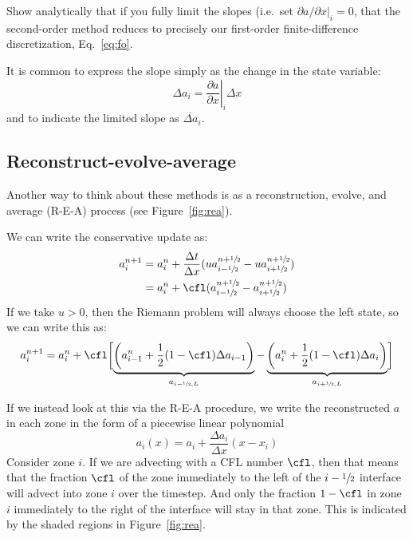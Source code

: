\begin{exercise}
{Show analytically that if you fully limit the slopes
  (i.e.\ set $\partial a/\partial x |_i = 0$, that the second-order
  method reduces to precisely our first-order finite-difference discretization,
  Eq.~\ref{eq:fo}.  }
\end{exercise}

It is common to express the slope simply as the change in the state variable:
\begin{equation}
\Delta a_i = \left . \frac{\partial a}{\partial x} \right |_i \Delta x
\end{equation}
and to indicate the limited slope as $\overline{\Delta a}_i$.



\subsection{Reconstruct-evolve-average}

Another way to think about these methods is as a reconstruction,
evolve, and average (R-E-A) process (see Figure~\ref{fig:rea}).

We can write the conservative update as:
\begin{align}
a_i^{n+1} &= a_i^n + \frac{\Delta t}{\Delta x}
    (u a^{n+\myhalf}_{i-\myhalf} - u a^{n+\myhalf}_{i+\myhalf} ) \\
          &= a_i^n + \cfl (a^{n+\myhalf}_{i-\myhalf} - a^{n+\myhalf}_{i+\myhalf} )
\end{align}
If we take $u > 0$, then the Riemann problem will always choose the
left state, so we can write this as:
\begin{equation}
a_i^{n+1} = a_i^n +
     \cfl \biggl [\underbrace{\left (a_{i-1}^n + \frac{1}{2} (1-\cfl) \Delta a_{i-1} \right )}_{a_{i-\myhalf,L}} -
              \underbrace{\left (a_{i}^n + \frac{1}{2} (1-\cfl) \Delta a_{i} \right )}_{a_{i+\myhalf,L}}
       \biggr ] \label{eq:rea_orig}
\end{equation}

If we instead look at this via the R-E-A procedure, we write the reconstructed
$a$ in each zone in the form of a piecewise linear polynomial
\begin{equation}
a_i(x) = a_i + \frac{\Delta a_i}{\Delta x} (x - x_i)
\end{equation}
Consider zone $i$.
If we are advecting with a CFL number $\cfl$, then that means that the fraction
$\cfl$ of the zone immediately to the left of the $i-{\sfrac{1}{2}}$ interface will advect
into zone $i$ over the timestep.  And only the fraction $1-\cfl$ in zone $i$
immediately to the right of the interface will stay in that zone.  This
is indicated by the shaded regions in Figure~\ref{fig:rea}.

